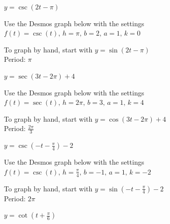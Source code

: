 \documentclass{ximera}
\begin{document}
\begin{question}
\begin{problem}
    $y = \csc (2t - \pi)$

\begin{solution}
Use the Desmos graph below with the settings $f(t)=\csc(t),\,h=\pi,\,b=2,\,a=1,\,k=0$

\begin{center} 
\end{center}

To graph by hand, start with $y = \sin(2t - \pi)$\\
Period: $\pi$\\

\end{solution}
\end{problem}

\begin{problem}
    $y = \sec(3t - 2\pi) + 4$ 

\begin{solution}
Use the Desmos graph below with the settings $f(t)=\sec(t),\,h=2\pi,\,b=3,\,a=1,\,k=4$

\begin{center} 
\end{center}

To graph by hand, start with $y = \cos (3t - 2\pi) + 4$\\
Period: $\frac{2\pi}{3}$\\

\end{solution}
\end{problem}

\begin{problem}
    $y = \csc \left( -t - \frac{\pi}{4} \right) - 2$

\begin{solution}
Use the Desmos graph below with the settings $f(t)=\csc(t),\,h=\frac{\pi}{4},\,b=-1,\,a=1,\,k=-2$

\begin{center} 
\end{center}

To graph by hand, start with $y = \sin \left( -t - \frac{\pi}{4} \right) - 2$ \\
Period: $2\pi$\\

\end{solution}
\end{problem}

\begin{problem}
    $y = \cot \left( t + \frac{\pi}{6} \right)$


\end{problem}
\end{question}
\end{document}
